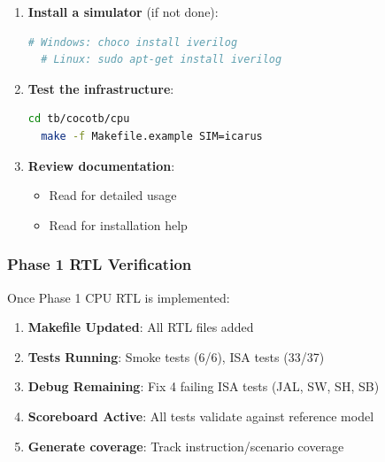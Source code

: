 \begin{record}

\begin{enumerate}
\def\labelenumi{\arabic{enumi}.}
\item
  \textbf{Install a simulator} (if not done):

  \begin{lstlisting}[language=bash]
  # Windows: choco install iverilog
  # Linux: sudo apt-get install iverilog
  \end{lstlisting}
\item
  \textbf{Test the infrastructure}:

  \begin{lstlisting}[language=bash]
  cd tb/cocotb/cpu
  make -f Makefile.example SIM=icarus
  \end{lstlisting}
\item
  \textbf{Review documentation}:

  \begin{itemize}
  \tightlist
  \item
    Read  for detailed usage
  \item
    Read  for installation help
  \end{itemize}
\end{enumerate}

\end{record}

\subsubsection{Phase 1 RTL Verification}\label{cr:app:archive-cocotb-setup-summary:phase-1-rtl-verification}

\begin{record}

Once Phase 1 CPU RTL is implemented:

\begin{enumerate}
\def\labelenumi{\arabic{enumi}.}
\tightlist
\item
  \ok{} \textbf{Makefile Updated}: All RTL files added
\item
  \ok{} \textbf{Tests Running}: Smoke tests (6/6), ISA tests (33/37)
\item
  \textbf{Debug Remaining}: Fix 4 failing ISA tests (JAL, SW, SH, SB)
\item
  \textbf{Scoreboard Active}: All tests validate against reference model
\item
  \textbf{Generate coverage}: Track instruction/\allowbreak{}scenario
  coverage
\end{enumerate}

\end{record}

